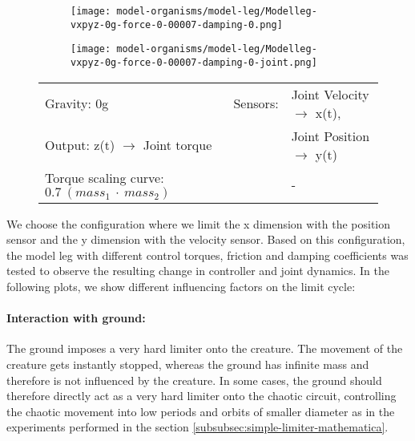 \documentclass[main]{subfiles}
\begin{document}
\begin{figure}[H]
	\centering
		\begin{subfigure}[c]{0.45\textwidth}
	\texttt{[image: model-organisms/model-leg/Modelleg-vxpyz-0g-force-0-00007-damping-0.png]}
		\end{subfigure}
	\begin{subfigure}[c]{0.45\textwidth}
	\texttt{[image: model-organisms/model-leg/Modelleg-vxpyz-0g-force-0-00007-damping-0-joint.png]}
		\end{subfigure}
	\caption[Limited chaotic controller controlling model leg]{}
	\begin{tabular}{l|ll}
	\hline 
	Gravity: 0g  & Sensors: & Joint Velocity \(\rightarrow\) x(t),\\
	 Output: z(t) \(\rightarrow\) Joint torque & & Joint Position \(\rightarrow\) y(t) \\
	  Torque scaling curve: \(0.7~(mass_1~\cdot~mass_2)\) & & - \\
	  \hline
	\end{tabular}

	\label{figure:limited-model-leg6}
\end{figure}

We choose the configuration where we limit the x dimension with the position sensor and the y dimension with the velocity sensor. Based on this configuration, the model leg with different control torques, friction and damping coefficients was tested to observe the resulting change in controller and joint dynamics. In the following plots, we show different influencing factors on the limit cycle:

\paragraph{Interaction with ground:} The ground imposes a very hard limiter onto the creature. The movement of the creature gets instantly stopped, whereas the ground has infinite mass and therefore is not influenced by the creature. In some cases, the ground should therefore directly act as a very hard limiter onto the chaotic circuit, controlling the chaotic movement into low periods and orbits of smaller diameter as in the experiments performed in the section \ref{subsubsec:simple-limiter-mathematica}. 
\end{document}
